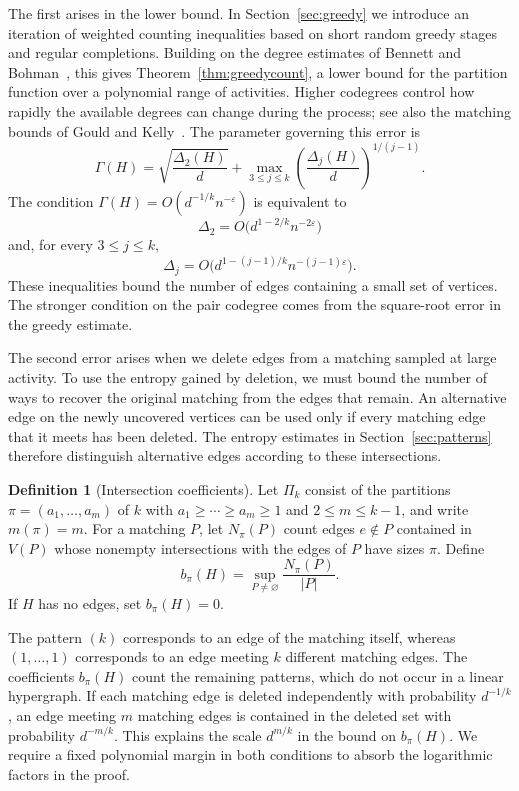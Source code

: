 \documentclass[11pt,reqno]{amsart}
\numberwithin{equation}{section}
\theoremstyle{plain}
\theoremstyle{definition}
\newtheorem{definition}[theorem]{Definition}
\newcommand{\eps}{\varepsilon}
\begin{document}
The first arises in the lower bound.
In Section~\ref{sec:greedy} we introduce an iteration of weighted counting inequalities based on short random greedy stages and regular completions.
Building on the degree estimates of Bennett and Bohman~\cite{BB}, this gives Theorem~\ref{thm:greedycount}, a lower bound for the partition function over a polynomial range of activities.
Higher codegrees control how rapidly the available degrees can change during the process; see also the matching bounds of Gould and Kelly~\cite{GK}.
The parameter governing this error is
\begin{equation}\label{eq:Gamma}
    \Gamma(H)=\sqrt{\frac{\Delta_2(H)}d}
    +\max_{3\le j\le k}\left(\frac{\Delta_j(H)}d\right)^{1/(j-1)}.
\end{equation}
The condition $\Gamma(H)=O(d^{-1/k}n^{-\eps})$ is equivalent to
\[
    \Delta_2=O\bigl(d^{1-2/k}n^{-2\eps}\bigr)
\]
and, for every $3\le j\le k$,
\[
    \Delta_j=O\bigl(d^{1-(j-1)/k}n^{-(j-1)\eps}\bigr).
\]
These inequalities bound the number of edges containing a small set of vertices.
The stronger condition on the pair codegree comes from the square-root error in the greedy estimate.

The second error arises when we delete edges from a matching sampled at large activity.
To use the entropy gained by deletion, we must bound the number of ways to recover the original matching from the edges that remain.
An alternative edge on the newly uncovered vertices can be used only if every matching edge that it meets has been deleted.
The entropy estimates in Section~\ref{sec:patterns} therefore distinguish alternative edges according to these intersections.

\begin{definition}[Intersection coefficients]\label{def:coefficients}
    Let $\Pi_k$ consist of the partitions $\pi=(a_1,\ldots,a_m)$ of $k$ with $a_1\ge\cdots\ge a_m\ge1$ and $2\le m\le k-1$, and write $m(\pi)=m$.
    For a matching $P$, let $N_\pi(P)$ count edges $e\notin P$ contained in $V(P)$ whose nonempty intersections with the edges of $P$ have sizes $\pi$.
    Define
    \[
        b_\pi(H)=\sup_{P\ne\varnothing}\frac{N_\pi(P)}{|P|}.
    \]
    If $H$ has no edges, set $b_\pi(H)=0$.
\end{definition}

The pattern $(k)$ corresponds to an edge of the matching itself, whereas $(1,\ldots,1)$ corresponds to an edge meeting $k$ different matching edges.
The coefficients $b_\pi(H)$ count the remaining patterns, which do not occur in a linear hypergraph.
If each matching edge is deleted independently with probability $d^{-1/k}$, an edge meeting $m$ matching edges is contained in the deleted set with probability $d^{-m/k}$.
This explains the scale $d^{m/k}$ in the bound on $b_\pi(H)$.
We require a fixed polynomial margin in both conditions to absorb the logarithmic factors in the proof.
\end{document}
